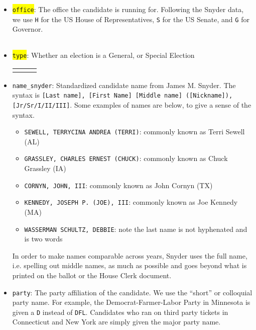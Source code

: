 \documentclass[12pt]{article}
\begin{document}
\begin{itemize}[leftmargin=*]

\item \colorbox{yellow}{\texttt{office}}: The office the candidate is running for. Following the Snyder data, we use \texttt{H} for the US House of Representatives, \texttt{S} for the US Senate, and \texttt{G} for Governor. 

    \begin{tabularx}{\linewidth}{C}
    
    \end{tabularx}
			
\item \colorbox{yellow}{\texttt{type}}: Whether an election is a General, or Special Election

\begin{tabularx}{\linewidth}{CCC}
 &  & 
\end{tabularx}



\item \texttt{name\_snyder}: Standardized candidate name from James M. Snyder.  The syntax is \texttt{[Last name], [First Name] [Middle name] ([Nickname]), [Jr/Sr/I/II/III]}.  Some examples of names are below, to give a sense of the syntax.

\begin{itemize}
	\item[] \texttt{SEWELL, TERRYCINA ANDREA (TERRI)}: commonly known as Terri Sewell (AL)
	\item[] \texttt{GRASSLEY, CHARLES ERNEST (CHUCK)}: commonly known as Chuck Grassley (IA)
	\item[] \texttt{CORNYN, JOHN, III}: commonly known as John Cornyn (TX)
	\item[] \texttt{KENNEDY, JOSEPH P. (JOE), III}: commonly known as Joe Kennedy (MA)
	\item[] \texttt{WASSERMAN SCHULTZ, DEBBIE}: note the last name is not hyphenated and is two words
\end{itemize}

In order to make names comparable across years, Snyder uses the full name, i.e. spelling out middle names, as much as possible and goes beyond what is printed on the ballot or the House Clerk document.

\item \texttt{party}: The party affiliation of the candidate. We use the ``short'' or colloquial party name. For example, the Democrat-Farmer-Labor Party in Minnesota is given a \texttt{D} instead of \texttt{DFL}. Candidates who ran on third party tickets in Connecticut and New York are simply given the major party name.   %


\end{itemize}
\end{document}
